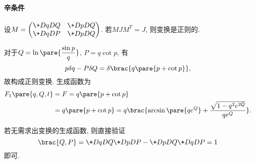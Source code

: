 \documentclass{ctexart}
\begin{document}

\paragraph{辛条件} %
\label{par:辛条件}

设$\displaystyle M = \begin{pmatrix}
    \+DqDQ & \+DpDQ \\
    \+DqDP & \+DpDQ
\end{pmatrix}$. 若$MJM^T = J$, 则变换是正则的.


\begin{sample}
    \begin{ex}
        对于$\displaystyle Q = \ln \pare{\frac{\sin p}{q}}$, $P = q\cot p$, 有
        \[ p\delta q - P\delta Q = \delta\brac{q\pare{p+\cot p}}, \]
        故构成正则变换. 生成函数为
        \begin{align*}
            F_1\pare{q,Q,t} &= F = q\pare{p+\cot p} \\
            &= q\pare{p+\cot p} = q\brac{\arcsin \pare{qe^Q} + \frac{\sqrt{1-q^2e^{2Q}}}{qe^Q}}.
        \end{align*}
    \end{ex}
    \begin{remark}
        若无需求出变换的生成函数, 则直接验证
        \[ \brac{Q,P} = \+DqDQ \+DpDP - \+DpDQ\+DqDP = 1 \]
        即可.
    \end{remark}
\end{sample}
\end{document}

